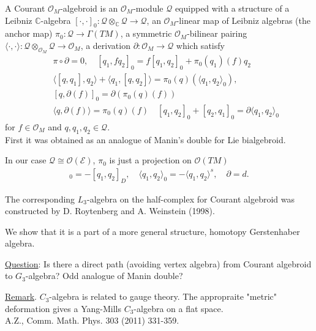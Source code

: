 \documentclass[9pt]{beamer}
\newcommand{\p}{\partial}
\def\cQ{\mathcal{Q}}
\def\cE{\mathcal{E}}
\begin{document}
\begin{frame}

A  Courant $\mathcal{O}_M$-algebroid is an $\mathcal{O}_M$-module $\cQ$
equipped with a structure of a Leibniz $\mathbb{C}$-algebra
$[ \cdot,\cdot ]_0 : \cQ\otimes_\mathbb{C}\cQ \to \cQ $, 
an $\mathcal{O}_M$-linear map of Leibniz algebras (the anchor map)
$
\pi_0 : \cQ \to \Gamma(TM)
$,
a symmetric $\mathcal{O}_M$-bilinear pairing
$\langle\cdot, \cdot\rangle: \cQ\otimes_{\mathcal{O}_M}\cQ \to \mathcal{O}_M $,  
a derivation
$
\p : \mathcal{O}_M \to \cQ
$
which satisfy
\begin{eqnarray*}
&&\pi\circ\partial =  0, \quad[q_1,fq_2]_0 = f[q_1,q_2] _0+ \pi_0(q_1)(f)q_2\\
&&\langle [q,q_1],q_2\rangle + \langle q_1,[q,q_2]\rangle  =  \pi_0(q)(\langle q_1, q_2\rangle_0), \\
&&[q,\partial(f)]_0  =  \partial(\pi_0(q)(f)) \nonumber\\
&&\langle q,\partial(f)\rangle  =  \pi_0(q)(f) \quad [q_1,q_2]_0 + [q_2,q_1]_0  =  \partial\langle q_1, q_2\rangle_0 \nonumber
\end{eqnarray*}
for $f\in\mathcal{O}_M$ and $q,q_1,q_2\in\cQ$.\\

First it was obtained as an analogue of Manin's double for Lie bialgebroid.

\vspace*{3mm}

 In our case $\cQ\cong\mathcal{O}(\cE)$, $\pi_0$ is just a projection on $\mathcal{O}(TM)$
\begin{eqnarray*}
[q_1,q_2]_0=-[q_1,q_2]_D, \quad \langle q_1, q_2\rangle_0=-\langle q_1, q_2\rangle^s, \quad \p=d.
\end{eqnarray*}

\end{frame}
\begin{frame}

The corresponding $L_3$-algebra on the half-complex  for Courant algebroid was constructed by D. Roytenberg and A. Weinstein (1998). 

\vspace*{3mm}

We show that it is a part of a more general structure, homotopy Gerstenhaber algebra.\\

\vspace*{3mm}

\underline{Question}: Is there a direct path (avoiding vertex algebra) from Courant algebroid to $G_3$-algebra? Odd analogue of Manin double?\\

\vspace*{3mm}

\underline{Remark}. $C_3$-algebra is  related to gauge theory. The appropraite "metric" deformation  gives a Yang-Mills $C_3$-algebra on a flat space.\\  
\hfill {\color{blue} \tiny{A.Z., Comm. Math. Phys. 303 (2011) 331-359.}}


\end{frame}
\end{document}
